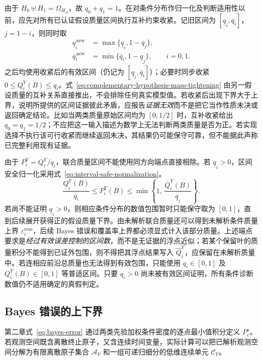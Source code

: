 \documentclass[master,fontset=ubuntu]{shnuthesis}
\theoremstyle{definition}
\begin{document}
由于 \(H_0\uplus H_1=\Omega_{H_A}\)，故 \(q_0+q_1=1\)。在对条件分布作归一化及判断适用性以前，应先对所有已认证假设质量区间执行互补约束收紧。记旧区间为 \([\underline q_i,\overline q_i]\)，\(j=1-i\)，则同时取
\begin{equation}
\begin{aligned}
\underline q_i^{\,\mathrm{new}}&=\max\{\underline q_i,1-\overline q_j\},\\
\overline q_i^{\,\mathrm{new}}&=\min\{\overline q_i,1-\underline q_j\},\qquad i=0,1.
\end{aligned}
\label{eq:complementary-hypothesis-mass-tightening}
\end{equation}
之后均使用收紧后的有效区间（仍记为 \([\underline q_i,\overline q_i]\)）；必要时同步收紧 \(0\leq Q_i^Y(B)\leq q_i\)。式~\eqref{eq:complementary-hypothesis-mass-tightening} 由另一假设质量的互补关系直接推出，不会排除任何真实模型值。若收紧后出现下界大于上界，说明所提供的区间证据彼此矛盾，应报告\emph{证据无效}而不是把它当作性质未决或返回确定结论。比如当两类质量原始区间均为 \([0,1/2]\) 时，互补收紧给出 \(q_0=q_1=1/2\)；不应把这一输入描述为数学上无法判断两类质量是否为正。若实现选择不执行该可行收紧而继续返回未决，其结果仍可能保守可靠，但不能据此声称已完整利用现有证据。

由于 \(P_i^Y=Q_i^Y/q_i\)，联合质量区间不能使用同方向端点直接相除。若 \(\underline q_i>0\)，区间安全归一化采用式~\eqref{eq:interval-safe-normalization}。
\begin{equation}
\frac{\underline Q_i^Y(B)}
{\overline q_i}
\leq
P_i^Y(B)
\leq
\min\!\left\{
1,\,
\frac{\overline Q_i^Y(B)}
{\underline q_i}
\right\}.
\label{eq:interval-safe-normalization}
\end{equation}
若尚不能证明 \(\underline q_i>0\)，则相应条件分布的数值包围暂时只能保守取为 \([0,1]\)，直到后续展开获得正的假设质量下界。由未解析联合质量还可以得到未解析条件质量上界 $\varepsilon_i^{\mathrm{rem}}$，后续 Bayes 错误和覆盖率上界都必须显式计入该部分质量。上述端点要求是\emph{经过有效误差控制的区间数}，而不是无证据的浮点近似；若某个保留叶的质量积分不能得到已证外包围，则不得把其浮点结果写入 $\widehat Q_i^Y$，应保留在未解析质量中。若连相应前沿总质量也无法得到有效包围，只能使用 $q_i\in[0,1]$ 及 $Q_i^Y(B)\in[0,1]$ 等普适区间。只要 $q_i>0$ 尚未被有效区间证明，所有条件诊断数值仍不适用确定的真假判定。

\subsection{Bayes 错误的上下界}

第二章式~\eqref{eq:bayes-error} 通过两类先验加权条件密度的逐点最小值积分定义 \(P_e^\star\)。若观测空间既含离散终止原子，又含连续时间变量，实际计算可以把已解析观测空间分解为有限离散原子集合 \(\mathcal A_Y\) 和一组可递归细分的低维连续单元 \(\mathcal C_Y\)。
\end{document}
